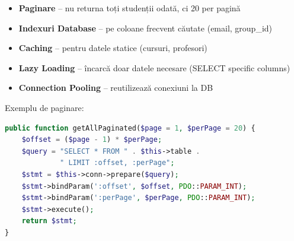 \begin{itemize}
    \item \textbf{Paginare} – nu returna toți studenții odată, ci 20 per pagină
    \item \textbf{Indexuri Database} – pe coloane frecvent căutate (email, group_id)
    \item \textbf{Caching} – pentru datele statice (cursuri, profesori)
    \item \textbf{Lazy Loading} – încarcă doar datele necesare (SELECT specific columns)
    \item \textbf{Connection Pooling} – reutilizează conexiuni la DB
\end{itemize}

Exemplu de paginare:

\begin{lstlisting}[language=PHP]
public function getAllPaginated($page = 1, $perPage = 20) {
    $offset = ($page - 1) * $perPage;
    $query = "SELECT * FROM " . $this->table .
             " LIMIT :offset, :perPage";
    $stmt = $this->conn->prepare($query);
    $stmt->bindParam(':offset', $offset, PDO::PARAM_INT);
    $stmt->bindParam(':perPage', $perPage, PDO::PARAM_INT);
    $stmt->execute();
    return $stmt;
}
\end{lstlisting}
